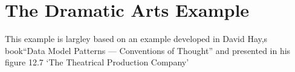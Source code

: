 \section{The Dramatic Arts Example}
\label{DramaticArtsExample}

{This example is largley based on an example developed 
in David Hay,s book``Data Model Patterns --- Conventions of Thought''
and presented in his figure 12.7 `The Theatrical Production Company'}



